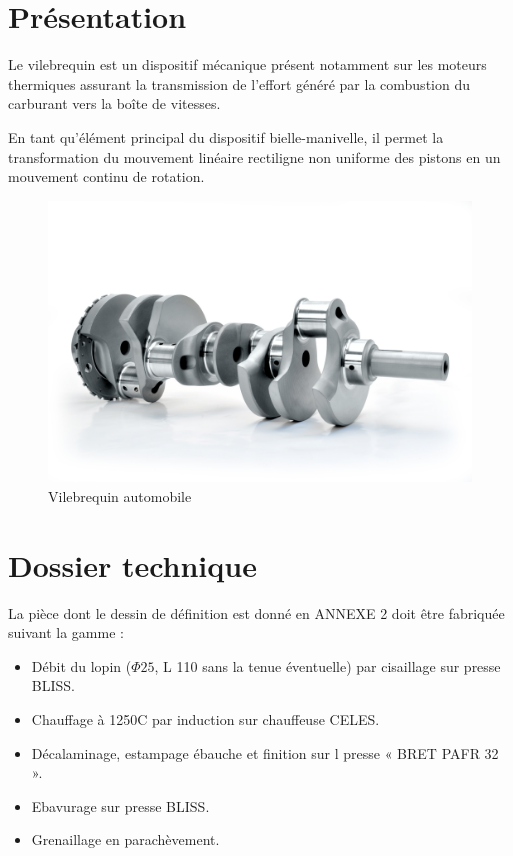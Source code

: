 

\section{Présentation}

Le vilebrequin est un dispositif mécanique présent notamment sur les moteurs thermiques assurant la transmission de l'effort généré par la combustion du carburant vers la boîte de vitesses. 

En tant qu'élément principal du dispositif bielle-manivelle, il permet la transformation du mouvement linéaire rectiligne non uniforme des pistons en un mouvement continu de rotation.

\begin{figure}[h!]
\centering\includegraphics[width=0.6\linewidth]{img/vilebrequin.jpg}
\caption{Vilebrequin automobile}
\end{figure}


\section{Dossier technique}

La pièce dont le dessin de définition est donné en ANNEXE 2 doit être fabriquée suivant la gamme :

\begin{itemize}
 \item Débit du lopin ($\Phi 25$, L 110 sans la tenue éventuelle) par cisaillage sur presse BLISS.
 \item Chauffage à 1250\textdegree C par induction sur chauffeuse CELES.
 \item Décalaminage, estampage ébauche et finition sur l presse « BRET PAFR 32 ».
 \item Ebavurage sur presse BLISS.
 \item Grenaillage en parachèvement.
\end{itemize}
 

